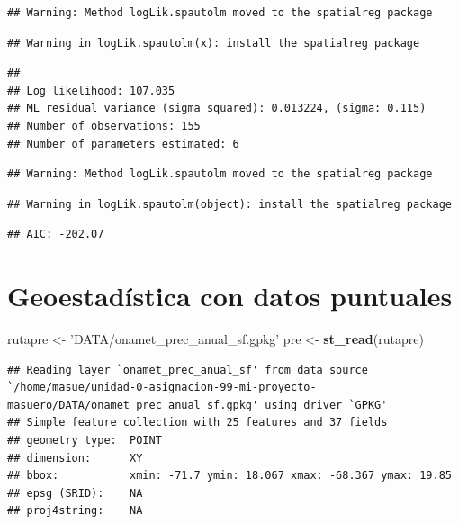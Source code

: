 \documentclass[11pt,]{article}
\newenvironment{Shaded}{\begin{snugshade}}{\end{snugshade}}
\newcommand{\KeywordTok}[1]{\textcolor[rgb]{0.13,0.29,0.53}{\textbf{#1}}}
\newcommand{\StringTok}[1]{\textcolor[rgb]{0.31,0.60,0.02}{#1}}
\newcommand{\NormalTok}[1]{#1}
\begin{document}
\begin{verbatim}
## Warning: Method logLik.spautolm moved to the spatialreg package
\end{verbatim}

\begin{verbatim}
## Warning in logLik.spautolm(x): install the spatialreg package
\end{verbatim}

\begin{verbatim}
## 
## Log likelihood: 107.035 
## ML residual variance (sigma squared): 0.013224, (sigma: 0.115)
## Number of observations: 155 
## Number of parameters estimated: 6
\end{verbatim}

\begin{verbatim}
## Warning: Method logLik.spautolm moved to the spatialreg package
\end{verbatim}

\begin{verbatim}
## Warning in logLik.spautolm(object): install the spatialreg package
\end{verbatim}

\begin{verbatim}
## AIC: -202.07
\end{verbatim}

\section{Geoestadística con datos
puntuales}\label{geoestaduxedstica-con-datos-puntuales}

\begin{Shaded}
\begin{Highlighting}[]
\NormalTok{rutapre <-}\StringTok{ 'DATA/onamet_prec_anual_sf.gpkg'}
\NormalTok{pre <-}\StringTok{ }\KeywordTok{st_read}\NormalTok{(rutapre)}
\end{Highlighting}
\end{Shaded}

\begin{verbatim}
## Reading layer `onamet_prec_anual_sf' from data source `/home/masue/unidad-0-asignacion-99-mi-proyecto-masuero/DATA/onamet_prec_anual_sf.gpkg' using driver `GPKG'
## Simple feature collection with 25 features and 37 fields
## geometry type:  POINT
## dimension:      XY
## bbox:           xmin: -71.7 ymin: 18.067 xmax: -68.367 ymax: 19.85
## epsg (SRID):    NA
## proj4string:    NA
\end{verbatim}
\end{document}
